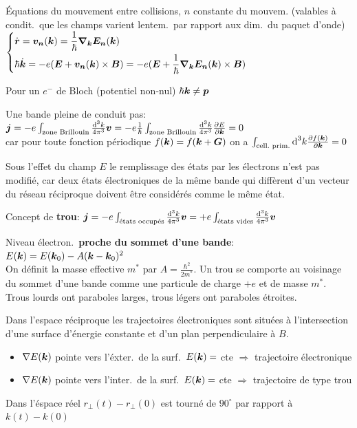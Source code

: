 \begin{squishlist}
    \item Équations du mouvement entre collisions, $n$ constante du mouvem. (valables à condit.\ que les champs varient lentem.\ par rapport aux dim.\ du paquet d'onde)
    $ \left\{ \begin{aligned} 
        & \dot{\vec{r}} = \vec{v_n}(\vk) = \frac{1}{\hbar} \vec{\nabla_\vec{k}E_n}(\vk) \\
        & \hbar \dot{\vec{k}} =  -e (\vec{E} + \vec{v_n}(\vk) \times \vec{B}) =  -e (\vec{E} + \frac{1}{\hbar} \vec{\nabla_\vec{k}E_n}(\vk) \times \vec{B})
    \end{aligned} \right. $
    
    \item Pour un $e^-$ de Bloch (potentiel non-nul) $\hbar \vk \neq \vec{p}$
    \item Une bande pleine de conduit pas: \\
    $\vec{j} = -e \int_{\text{zone Brillouin}} \frac{\ud^3 k}{4 \pi^3}\vec{v} = -e \frac{1}{\hbar} \int_{\text{zone Brillouin}} \frac{\ud^3 k}{4 \pi^3} \D{\vec{k}}{E} = 0$ \\
    car pour toute fonction périodique $f(\vk) = f(\vk + \vG)$ on a $\int_{\text{cell.\ prim.}}\ud^3 k \D{\vk}{f(\vk)} = 0$
    \item Sous l’eﬀet du champ $E$ le remplissage
    des états par les électrons n’est pas modifié, car deux états électroniques de la même bande qui diffèrent d’un vecteur du réseau réciproque doivent être considérés comme le même état.
    \item Concept de \textbf{trou}: $\vec{j} = -e \int_{\text{états occupés}} \frac{\ud^3 k}{4 \pi^3}\vec{v} = +e \int_{\text{états vides}} \frac{\ud^3 k}{4 \pi^3}\vec{v}$
    \item Niveau électron.\ \textbf{proche du sommet d'une bande}: $E(\vk) = E(\vk_0) - A(\vk - \vk_0)^2$ \\
    On définit la masse effective $m^*$ par $A = \frac{\hbar^2}{2m^*}$.
    Un trou se comporte au voisinage du sommet d’une bande
    comme une particule de charge $+e$ et de masse $m^*$. Trous lourds ont paraboles larges, trous légers ont paraboles étroites.

    \item Dans l’espace réciproque les trajectoires électroniques sont situées à l’intersection d’une surface d’énergie constante et d’un plan perpendiculaire à $B$.
    \begin{itemize}
        \item $\nabla E(\vk)$ pointe vers l'éxter.\ de la surf.\ $E(\vk) = $ cte $\Rightarrow$ trajectoire électronique
        \item $\nabla E(\vk)$ pointe vers l'inter.\ de la surf.\ $E(\vk) = $ cte $\Rightarrow$ trajectoire de type trou
    \end{itemize}
    \item Dans l'éspace réel $r_{\perp}(t) - r_{\perp}(0)$ est tourné de $90^{\circ}$ par rapport à $k(t) - k(0)$
\end{squishlist}

